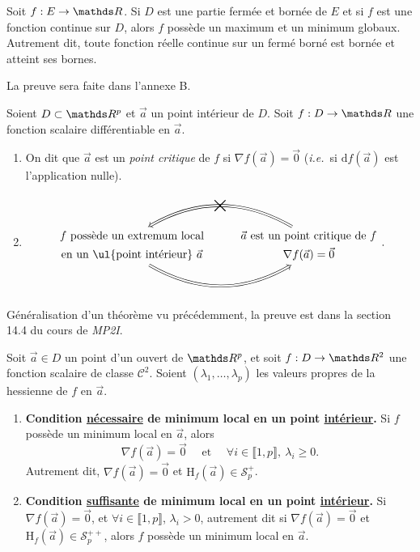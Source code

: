 \begin{thm}
	Soit $f : E \to \R$. Si $D$ est une partie fermée et bornée de $E$ et si $f$ est une fonction continue sur $D$, alors $f$ possède un maximum et un minimum globaux. Autrement dit, toute fonction réelle continue sur un fermé borné est bornée et atteint ses bornes.
\end{thm}

La preuve sera faite dans l'annexe B.

\begin{prop-defn}
	Soient $D \subset \R^p$ et $\vec{a}$ un point intérieur de $D$. Soit $f : D \to \R$ une fonction scalaire différentiable en $\vec{a}$.
	\begin{enumerate}
		\item On dit que $\vec{a}$ est un \textit{point critique} de $f$ si $\nabla f(\vec{a}) = \vec{0}$ (\textit{i.e.}\ si $\mathrm{d}f(\vec{a})$ est l'application nulle).
		\item
			\[
				\begin{tikzcd}
					\text{$f$ possède un extremum local} \ar[r, Leftarrow, bend left, "\text{\huge$\times$}"{anchor=center, sloped}] & \text{$\vec{a}$ est un point critique de $f$}\\[-7mm]
					\text{en un \ul{point intérieur} $\vec{a}$} \ar[r, Rightarrow, bend right] & \nabla f(\vec{a}) = \vec{0}
				\end{tikzcd}
			.\]
	\end{enumerate}
\end{prop-defn}

\begin{prv}
	Généralisation d'un théorème vu précédemment, la preuve est dans la section 14.4 du cours de \textit{MP2I}.
\end{prv}

\begin{prop}
	Soit $\vec{a} \in D$ un point d'un ouvert de $\R^p$, et soit $f : D \to \R^2$ une fonction scalaire de classe $\mathcal{C}^2$. Soient $(\lambda_1, \ldots, \lambda_p)$ les valeurs propres de la hessienne de $f$ en $\vec{a}$.
	\begin{enumerate}
		\item \textbf{Condition \ul{nécessaire} de minimum local en un point \ul{intérieur}.} Si $f$ possède un minimum local en $\vec{a}$, alors
			\[
				\nabla f(\vec{a}) = \vec{0} \quad \text{ et }\quad \forall i \in \llbracket 1,p \rrbracket,\: \lambda_i \ge 0
			.\]
			Autrement dit, $\nabla f(\vec{a}) = \vec{0}$ et $\mathrm{H}_f(\vec{a}) \in \mathcal{S}_p^+$.
		\item \textbf{Condition \ul{suffisante} de minimum local en un point \ul{intérieur}.}
			Si $\nabla f(\vec{a}) = \vec{0}$, et $\forall i \in \llbracket 1,p \rrbracket$, $\lambda_i > 0$, autrement dit si $\nabla f(\vec{a}) = \vec{0}$ et $\mathrm{H}_f(\vec{a}) \in \mathcal{S}_p^{++}$, alors $f$ possède un minimum local en $\vec{a}$.
	\end{enumerate}
\end{prop}

